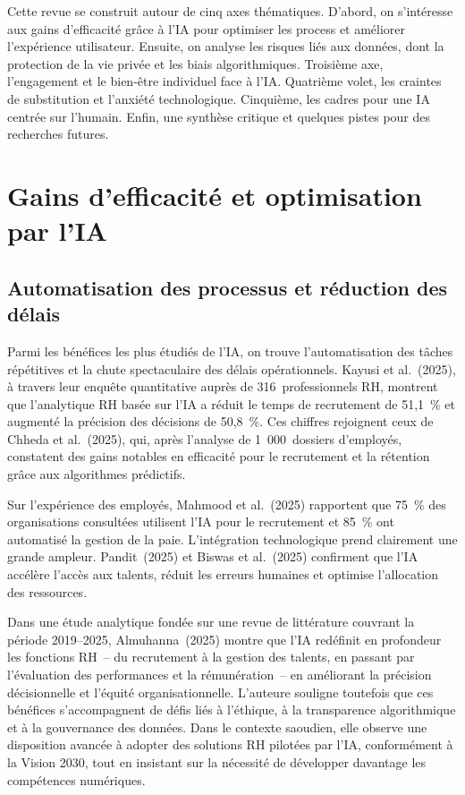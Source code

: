 \documentclass[12pt,a4paper]{article}
\begin{document}
Cette revue se construit autour de cinq axes thématiques. D'abord, on s'intéresse aux gains
d'efficacité grâce à l'IA pour optimiser les process et améliorer l'expérience utilisateur.
Ensuite, on analyse les risques liés aux données, dont la protection de la vie privée et les
biais algorithmiques. Troisième axe, l'engagement et le bien-être individuel face à l'IA.
Quatrième volet, les craintes de substitution et l'anxiété technologique. Cinquième, les
cadres pour une IA centrée sur l'humain. Enfin, une synthèse critique et quelques pistes
pour des recherches futures.

\section{Gains d'efficacité et optimisation par l'IA}

\subsection{Automatisation des processus et réduction des délais}

Parmi les bénéfices les plus étudiés de l'IA, on trouve l'automatisation des tâches répétitives
et la chute spectaculaire des délais opérationnels. Kayusi et al.~(2025), à travers leur enquête
quantitative auprès de 316~professionnels RH, montrent que l'analytique RH basée sur
l'IA a réduit le temps de recrutement de 51,1~\% et augmenté la précision des décisions de
50,8~\%. Ces chiffres rejoignent ceux de Chheda et al.~(2025), qui, après l'analyse de
1~000~dossiers d'employés, constatent des gains notables en efficacité pour le recrutement et
la rétention grâce aux algorithmes prédictifs.

Sur l'expérience des employés, Mahmood et al.~(2025) rapportent que 75~\% des organisations
consultées utilisent l'IA pour le recrutement et 85~\% ont automatisé la gestion de la paie.
L'intégration technologique prend clairement une grande ampleur. Pandit~(2025) et
Biswas et al.~(2025) confirment que l'IA accélère l'accès aux talents, réduit les erreurs
humaines et optimise l'allocation des ressources.

Dans une étude analytique fondée sur une revue de littérature couvrant la période 2019--2025,
Almuhanna~(2025) montre que l'IA redéfinit en profondeur les fonctions RH~-- du recrutement
à la gestion des talents, en passant par l'évaluation des performances et la rémunération~--
en améliorant la précision décisionnelle et l'équité organisationnelle. L'auteure souligne
toutefois que ces bénéfices s'accompagnent de défis liés à l'éthique, à la transparence
algorithmique et à la gouvernance des données. Dans le contexte saoudien, elle observe
une disposition avancée à adopter des solutions RH pilotées par l'IA, conformément à la
Vision 2030, tout en insistant sur la nécessité de développer davantage les compétences
numériques.
\end{document}
